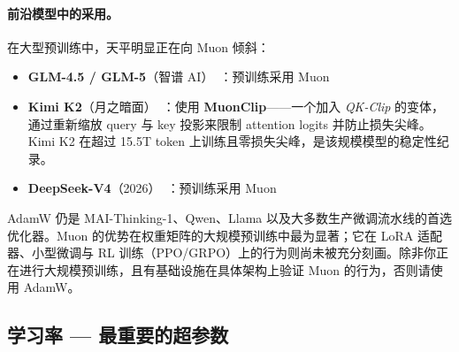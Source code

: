 \paragraph{前沿模型中的采用。}
在大型预训练中，天平明显正在向 Muon 倾斜：
\begin{itemize}
  \item \textbf{GLM-4.5 / GLM-5}（智谱 AI）~\cite{glm45_2025,glm5_2026}：预训练采用 Muon
  \item \textbf{Kimi K2}（月之暗面）~\cite{kimik2_2025}：使用 \textbf{MuonClip}——一个加入 \emph{QK-Clip} 的变体，通过重新缩放 query 与 key 投影来限制 attention logits 并防止损失尖峰。Kimi K2 在超过 15.5T token 上训练且零损失尖峰，是该规模模型的稳定性纪录。
  \item \textbf{DeepSeek-V4}（2026）~\cite{deepseekv4_2026}：预训练采用 Muon
\end{itemize}

\begin{warningbox}[AdamW 仍是安全默认]
AdamW 仍是 MAI-Thinking-1、Qwen、Llama 以及大多数生产微调流水线的首选优化器。Muon 的优势在权重矩阵的大规模预训练中最为显著；它在 LoRA 适配器、小型微调与 RL 训练（PPO/GRPO）上的行为则尚未被充分刻画。除非你正在进行大规模预训练，且有基础设施在具体架构上验证 Muon 的行为，否则请使用 AdamW。
\end{warningbox}

\newpage
\subsection{学习率 --- 最重要的超参数}
\label{learning-rate-the-most-important-hyperparameter}

